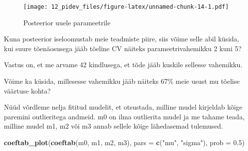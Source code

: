 \documentclass[]{book}
\newenvironment{Shaded}{\begin{snugshade}}{\end{snugshade}}
\newcommand{\KeywordTok}[1]{\textcolor[rgb]{0.13,0.29,0.53}{\textbf{#1}}}
\newcommand{\DataTypeTok}[1]{\textcolor[rgb]{0.13,0.29,0.53}{#1}}
\newcommand{\DecValTok}[1]{\textcolor[rgb]{0.00,0.00,0.81}{#1}}
\newcommand{\FloatTok}[1]{\textcolor[rgb]{0.00,0.00,0.81}{#1}}
\newcommand{\StringTok}[1]{\textcolor[rgb]{0.31,0.60,0.02}{#1}}
\newcommand{\CommentTok}[1]{\textcolor[rgb]{0.56,0.35,0.01}{\textit{#1}}}
\newcommand{\OperatorTok}[1]{\textcolor[rgb]{0.81,0.36,0.00}{\textbf{#1}}}
\newcommand{\NormalTok}[1]{#1}
\begin{document}
\begin{figure}
\centering
\texttt{[image: 12\_pidev\_files/figure-latex/unnamed-chunk-14-1.pdf]}
\caption{\label{fig:unnamed-chunk-14}Posteerior uuele parameetrile}
\end{figure}

Kuna posteerior iseloomustab meie teadmiste piire, siis võime selle abil
küsida, kui suure tõenäosusega jääb tõeline CV näiteks
parameetrivahemikku 2 kuni 5?

\begin{Shaded}
\end{Shaded}

Vastus on, et me arvame 42 kindlusega, et tõde jääb kuskile sellesse
vahemikku.

Võime ka küsida, millesesse vahemikku jääb näiteks 67\% meie usust mu
tõelise väärtuse kohta?

\begin{Shaded}
\end{Shaded}

Nüüd võrdleme nelja fititud mudelit, et otsustada, milline mudel
kirjeldab kõige paremini outlieritega andmeid. m0 on ilma outlierita
mudel ja me tahame teada, milline mudel m1, m2 või m3 annab sellele
kõige lähedasemad tulemused.

\begin{Shaded}
\begin{Highlighting}[]
\KeywordTok{coeftab_plot}\NormalTok{(}\KeywordTok{coeftab}\NormalTok{(m0, m1, m2, m3), }
             \DataTypeTok{pars =} \KeywordTok{c}\NormalTok{(}\StringTok{"mu"}\NormalTok{, }\StringTok{"sigma"}\NormalTok{), }
             \DataTypeTok{prob =} \FloatTok{0.5}\NormalTok{)}
\end{Highlighting}
\end{Shaded}
\end{document}
